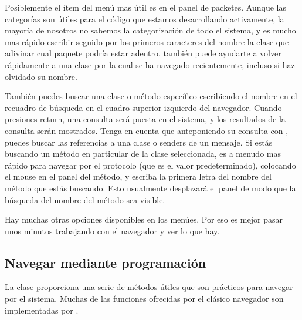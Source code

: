 \documentclass[spanish,a4paper,10pt,twoside]{book}
\begin{document}
Posiblemente el \'item del men\'u mas \'util es  en el panel de packetes.  Aunque las categor\'ias son \'utiles para el c\'odigo que estamos desarrollando activamente, la mayor\'ia de nosotros no sabemos la categorizaci\'on de todo el sistema, y es mucho mas r\'apido escribir  seguido por los primeros caracteres del nombre la clase que adivinar cual paquete podr\'ia estar adentro.   tambi\'en puede ayudarte a volver r\'apidamente a una clase por la cual se ha navegado recientemente, incluso si haz olvidado su nombre.

Tambi\'en puedes buscar una clase o m\'etodo espec\'ifico escribiendo el nombre en el recuadro de b\'usqueda en el cuadro superior izquierdo del navegador. Cuando presiones return, una consulta ser\'a puesta en el sistema, y los resultados de la consulta ser\'an mostrados.  Tenga en cuenta que anteponiendo su consulta con \ct{#}, puedes buscar las referencias a una clase o senders de un mensaje.
Si est\'as buscando un m\'etodo en particular de la clase seleccionada, es a menudo mas r\'apido para navegar por el protocolo  (que es el valor predeterminado), colocando el mouse en el panel del m\'etodo, y escriba la primera letra del nombre del m\'etodo que est\'as buscando.
Esto usualmente desplazar\'a el panel de modo que la b\'usqueda del nombre del m\'etodo sea visible.


Hay muchas otras opciones disponibles en los men\'ues. Por eso es mejor pasar unos minutos trabajando con el navegador y ver lo que hay.


\subsection{Navegar mediante programaci\'on}

La clase  proporciona una serie de m\'etodos \'utiles que son pr\'acticos para navegar por el sistema.
Muchas de las funciones ofrecidas por el cl\'asico navegador son implementadas por .
\end{document}
